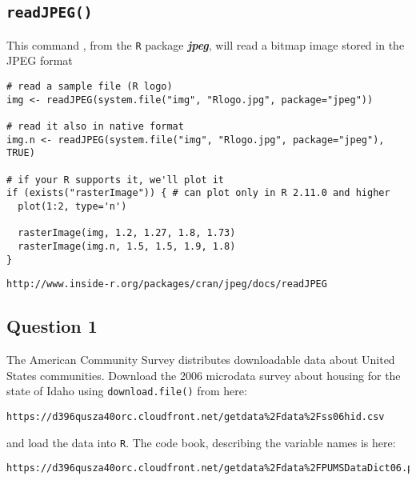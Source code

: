 \documentclass[]{article}
\begin{document}
\subsection*{\texttt{readJPEG()}}

This command , from the \texttt{R} package \textbf{\textit{jpeg}}, will read a bitmap image stored in the JPEG format 
\begin{framed}
\begin{verbatim}
# read a sample file (R logo)
img <- readJPEG(system.file("img", "Rlogo.jpg", package="jpeg"))
 
# read it also in native format
img.n <- readJPEG(system.file("img", "Rlogo.jpg", package="jpeg"), TRUE)
 
# if your R supports it, we'll plot it
if (exists("rasterImage")) { # can plot only in R 2.11.0 and higher
  plot(1:2, type='n')
 
  rasterImage(img, 1.2, 1.27, 1.8, 1.73)
  rasterImage(img.n, 1.5, 1.5, 1.9, 1.8)
}
\end{verbatim}
\end{framed}

\begin{verbatim}
http://www.inside-r.org/packages/cran/jpeg/docs/readJPEG
\end{verbatim}
\subsection*{Question 1}
The American Community Survey distributes downloadable data about United States communities. Download the 2006 microdata survey about housing for the state of Idaho using \texttt{download.file()} from here: 
\begin{verbatim}
https://d396qusza40orc.cloudfront.net/getdata%2Fdata%2Fss06hid.csv 
\end{verbatim}
and load the data into \texttt{R}. The code book, describing the variable names is here: 
\begin{verbatim}
https://d396qusza40orc.cloudfront.net/getdata%2Fdata%2FPUMSDataDict06.pdf 
\end{verbatim}
\end{document}
